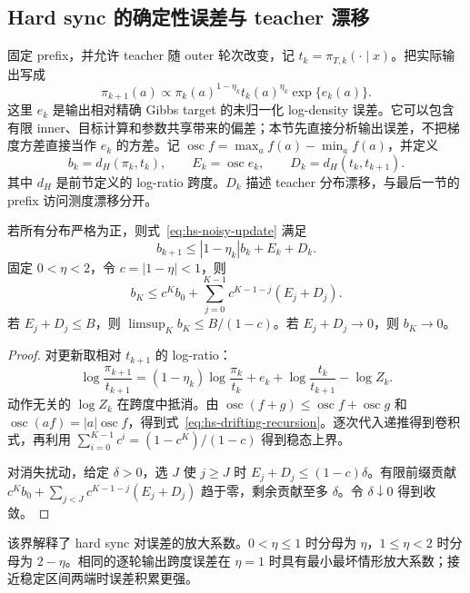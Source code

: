 \subsection{Hard sync 的确定性误差与 teacher 漂移}
\label{sec:hs-noise}

固定 prefix，并允许 teacher 随 outer 轮次改变，记 $t_k=\pi_{T,k}(\cdot\mid x)$。把实际输出写成
\begin{equation}\label{eq:hs-noisy-update}
 \pi_{k+1}(a)\propto\pi_k(a)^{1-\eta_k}t_k(a)^{\eta_k}
             \exp\{e_k(a)\}.
\end{equation}
这里 $e_k$ 是输出相对精确 Gibbs target 的未归一化 log-density 误差。它可以包含有限 inner、目标计算和参数共享带来的偏差；本节先直接分析输出误差，不把梯度方差直接当作 $e_k$ 的方差。记 $\operatorname{osc}f=\max_a f(a)-\min_a f(a)$，并定义
\[
 b_k=d_H(\pi_k,t_k),\qquad E_k=\operatorname{osc}e_k,
 \qquad D_k=d_H(t_k,t_{k+1}).
\]
其中 $d_H$ 是前节定义的 log-ratio 跨度。$D_k$ 描述 teacher 分布漂移，与最后一节的 prefix 访问测度漂移分开。

\begin{theorem}\label{thm:hs-input-state}
若所有分布严格为正，则式~\eqref{eq:hs-noisy-update} 满足
\begin{equation}\label{eq:hs-drifting-recursion}
 b_{k+1}\leq |1-\eta_k|b_k+E_k+D_k.
\end{equation}
固定 $0<\eta<2$，令 $c=|1-\eta|<1$，则
\[
 b_K\leq c^K b_0+\sum_{j=0}^{K-1}c^{K-1-j}(E_j+D_j).
\]
若 $E_j+D_j\leq B$，则 $\limsup_K b_K\leq B/(1-c)$。若 $E_j+D_j\to0$，则 $b_K\to0$。
\end{theorem}

\begin{proof}
对更新取相对 $t_{k+1}$ 的 log-ratio：
\[
 \log\frac{\pi_{k+1}}{t_{k+1}}
 =(1-\eta_k)\log\frac{\pi_k}{t_k}+e_k
       +\log\frac{t_k}{t_{k+1}}-\log Z_k.
\]
动作无关的 $\log Z_k$ 在跨度中抵消。由 $\operatorname{osc}(f+g)\leq\operatorname{osc}f+\operatorname{osc}g$ 和 $\operatorname{osc}(af)=|a|\operatorname{osc}f$，得到式~\eqref{eq:hs-drifting-recursion}。逐次代入递推得到卷积式，再利用 $\sum_{i=0}^{K-1}c^i=(1-c^K)/(1-c)$ 得到稳态上界。

对消失扰动，给定 $\delta>0$，选 $J$ 使 $j\geq J$ 时 $E_j+D_j\leq(1-c)\delta$。有限前缀贡献 $c^Kb_0+\sum_{j<J}c^{K-1-j}(E_j+D_j)$ 趋于零，剩余贡献至多 $\delta$。令 $\delta\downarrow0$ 得到收敛。
\end{proof}

该界解释了 hard sync 对误差的放大系数。$0<\eta\leq1$ 时分母为 $\eta$，$1\leq\eta<2$ 时分母为 $2-\eta$。相同的逐轮输出跨度误差在 $\eta=1$ 时具有最小最坏情形放大系数；接近稳定区间两端时误差积累更强。

